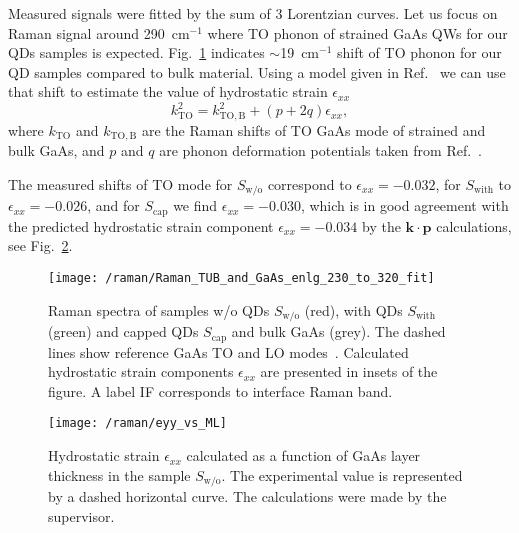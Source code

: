 Measured signals were fitted by the sum of 3 Lorentzian curves.
Let us focus on Raman signal around 290~cm$^{-1}$ where TO phonon of strained GaAs QWs for our QDs samples is expected. Fig.~\ref{fig:raman} indicates $\sim$19~cm$^{-1}$ shift of TO phonon for our QD samples compared to bulk material. Using a model given in Ref.~\cite{Montazeri_Nano2010} we can use that shift to estimate the value of hydrostatic strain $\epsilon_{xx}$ 
\begin{equation}
k_\mathrm{TO}^2 = k_\mathrm{TO,B}^2 + (p+2q)\epsilon_{xx},
\end{equation}
where $k_\mathrm{TO}$ and $k_\mathrm{TO,B}$ are the Raman shifts of TO GaAs mode of strained and bulk GaAs, and $p$ and $q$ are phonon deformation potentials taken from Ref.~\cite{Cerdeira_PRB1972}.

The measured shifts of TO mode for $S_\mathrm{w/o}$ correspond to $\epsilon_{xx}=-0.032$, for $S_\mathrm{with}$ to $\epsilon_{xx}=-0.026$,  and for $S_\mathrm{cap}$ we find $\epsilon_{xx}=-0.030$, which is in good agreement with the predicted hydrostatic strain component $\epsilon_{xx}=-0.034$ by the $\mathbf{k \cdot p}$ calculations, see Fig.~\ref{fig:raman_theory_wo}. %
\begin{figure}
	\centering
	\texttt{[image: /raman/Raman\_TUB\_and\_GaAs\_enlg\_230\_to\_320\_fit]}
	\caption{Raman spectra of samples w/o QDs $S_\mathrm{w/o}$ (red), with QDs $S_\mathrm{with}$ (green) and capped QDs $S_\mathrm{cap}$ and bulk GaAs (grey). The dashed lines show reference GaAs TO and LO modes~\citep{Esther_Nanotech2013}. Calculated hydrostatic strain components $\epsilon_{xx}$ are presented in insets of the figure. A label IF corresponds to interface Raman band.}
	\label{fig:raman}
\end{figure}

\begin{figure}
	\centering
	\texttt{[image: /raman/eyy\_vs\_ML]}
	\caption{Hydrostatic strain $\epsilon_{xx}$ calculated as a function of GaAs layer thickness in the sample $S_\mathrm{w/o}$. The experimental value is represented by a dashed horizontal curve. The calculations were made by the supervisor.}
	\label{fig:raman_theory_wo}
\end{figure}


\clearpage
